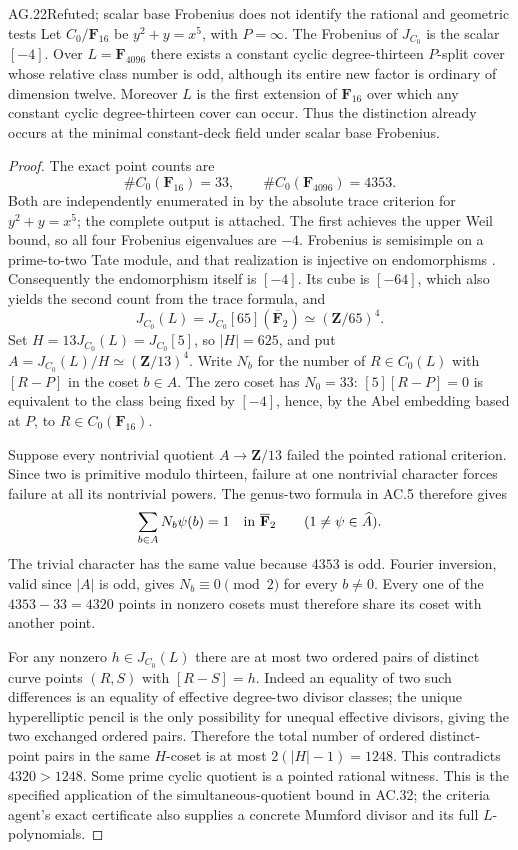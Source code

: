 \begin{claim}{AG.22}{Refuted; scalar base Frobenius does not identify the rational and geometric tests}
Let $C_0/\mathbf F_{16}$ be $y^2+y=x^5$, with
$P=\infty$. The Frobenius of $J_{C_0}$ is the scalar
$[-4]$. Over $L=\mathbf F_{4096}$ there exists a
constant cyclic degree-thirteen $P$-split cover whose
relative class number is odd, although its entire new
factor is ordinary of dimension twelve.
Moreover $L$ is the first extension of $\mathbf F_{16}$
over which any constant cyclic degree-thirteen cover
can occur. Thus the distinction already occurs at the
minimal constant-deck field under scalar base Frobenius.
\end{claim}
\begin{proof}
The exact point counts are
\[
            \#C_0(\mathbf F_{16})=33,
             \qquad \#C_0(\mathbf F_{4096})=4353.
\]
Both are independently enumerated in
 by the absolute
trace criterion for $y^2+y=x^5$; the complete output
is attached. The first achieves the upper Weil bound,
so all four Frobenius eigenvalues are $-4$.
Frobenius is semisimple on a prime-to-two Tate module,
and that realization is injective on endomorphisms
\citep[Sections~1--2, pp.~134--139]{AG_Tate1966}.
Consequently the endomorphism itself is $[-4]$.
Its cube is $[-64]$, which also yields the second count
from the trace formula, and
\[
 J_{C_0}(L)=J_{C_0}[65](\overline{\mathbf F}_2)
                      \simeq(\mathbf Z/65)^4.
\]
Set $H=13J_{C_0}(L)=J_{C_0}[5]$, so $|H|=625$,
and put $A=J_{C_0}(L)/H\simeq(\mathbf Z/13)^4$.
Write $N_b$ for the number of $R\in C_0(L)$ with
$[R-P]$ in the coset $b\in A$.
The zero coset has $N_0=33$: $[5][R-P]=0$ is
equivalent to the class being fixed by $[-4]$, hence,
by the Abel embedding based at $P$, to
$R\in C_0(\mathbf F_{16})$.

Suppose every nontrivial quotient $A\to\mathbf Z/13$
failed the pointed rational criterion. Since two is
primitive modulo thirteen, failure at one nontrivial
character forces failure at all its nontrivial powers.
The genus-two formula in AC.5 therefore gives
\[
        \sum_{b\in A}N_b\psi(b)=1\quad\hbox{in }
        \overline{\mathbf F}_2
        \qquad(1\ne\psi\in\widehat A).
\]
The trivial character has the same value because
$4353$ is odd. Fourier inversion, valid since $|A|$
is odd, gives $N_b\equiv0\pmod2$ for every $b\ne0$.
Every one of the $4353-33=4320$ points in nonzero
cosets must therefore share its coset with another point.

For any nonzero $h\in J_{C_0}(L)$ there are at most
two ordered pairs of distinct curve points $(R,S)$
with $[R-S]=h$. Indeed an equality of two such
differences is an equality of effective degree-two
divisor classes; the unique hyperelliptic pencil is
the only possibility for unequal effective divisors,
giving the two exchanged ordered pairs. Therefore
the total number of ordered distinct-point pairs in
the same $H$-coset is at most
$2(|H|-1)=1248$. This contradicts $4320>1248$.
Some prime cyclic quotient is a pointed rational
witness. This is the specified application of the
simultaneous-quotient bound in AC.32; the criteria
agent's exact certificate also supplies a concrete
Mumford divisor and its full $L$-polynomials.


\end{proof}
